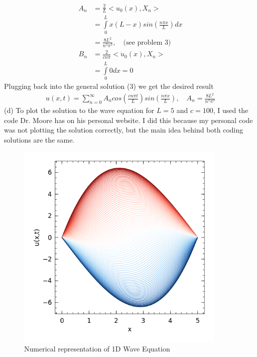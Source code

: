 \documentclass[10pt]{article}
\begin{document}
\begin{align*}
A_n & = \frac{2}{L} <u_0(x), X_n> \\
& = \int\limits_0^L x(L-x)sin(\frac{n\pi x}{L}) dx \\
& = \frac{8L^2}{n^3\pi^3}, \quad \text{(see problem 3)} \\
B_n & = \frac{2}{cn\pi}<\dot{u}_0(x), X_n> \\
& = \int\limits_0^L 0 dx = 0
\end{align*}
Plugging back into the general solution (3) we get the desired result
\begin{align*}
u(x,t) = \sum\limits_{n=0}^\infty A_ncos(\frac{cn\pi t}{L})sin(\frac{n \pi x}{L}), \quad A_n = \frac{8L^2}{n^3\pi^3}
\end{align*}
(d) To plot the solution to the wave equation for $L = 5$ and $c = 100$, I used the code Dr. Moore has on his personal website. I did this because my personal code was not plotting the solution correctly, but the main idea behind both coding solutions are the same.

\newpage

\begin{figure}[h]
\centering
\includegraphics[width=10cm]{wave.png}
\caption{Numerical representation of 1D Wave Equation}
\end{figure}
\end{document}
